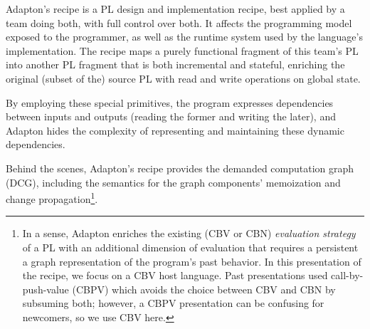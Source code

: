\documentclass[11pt]{article}
\begin{document}
\noindent
Adapton's recipe is a PL design and implementation recipe, best
applied by a team doing both, with full control over both.
%
It affects the programming model exposed to the programmer, as well as
the runtime system used by the language's implementation.
%
The recipe maps a purely functional fragment of this team's PL into
another PL fragment that is both incremental and stateful, enriching
the original (subset of the) source PL with read and write operations
on global state.


\begin{center}
\end{center}

\noindent
By employing these special primitives, the program expresses dependencies
between inputs and outputs (reading the former and writing the later),
and Adapton hides the complexity of representing and maintaining these
dynamic dependencies.

Behind the scenes, Adapton's recipe provides the demanded computation graph (DCG),
including the semantics for the graph components'
memoization and change propagation\footnote{
In a sense, Adapton enriches the existing (CBV or CBN)
\emph{evaluation strategy} of a PL with an additional dimension of
evaluation that requires a persistent a graph representation of the
program's past behavior.
%
In this presentation of the recipe, we focus on a CBV host language.
%
Past presentations used call-by-push-value (CBPV) which avoids the
choice between CBV and CBN by subsuming both; however, a CBPV
presentation can be confusing for newcomers, so we use CBV here.
}.
\end{document}
